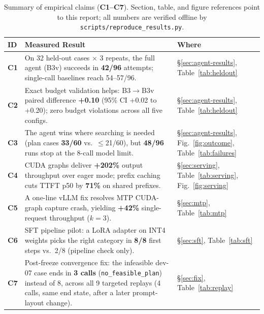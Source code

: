 \documentclass[10pt,letterpaper,twocolumn]{article}
\begin{document}
\begin{table}[t]
\centering\small
\caption{Summary of empirical claims (\textbf{C1--C7}). Section, table, and figure references point to this report; all numbers are verified offline by \texttt{scripts/reproduce\_results.py}.}\label{tab:claims}
\renewcommand{\arraystretch}{1.12}
\begin{tabularx}{\textwidth}{@{}l Y l@{}}
\toprule
\textbf{ID} & \textbf{Measured Result} & \textbf{Where} \\
\midrule
\textbf{C1} & On 32 held-out cases $\times$ 3 repeats, the full agent (B3v) succeeds in \textbf{42/96} attempts; single-call baselines reach 54--57/96. & \S\ref{sec:agent-results}, Table~\ref{tab:heldout} \\
\textbf{C2} & Exact budget validation helps: B3$\rightarrow$B3v paired difference \textbf{+0.10} (95\% CI +0.02 to +0.20); zero budget violations across all five configs. & \S\ref{sec:agent-results}, Table~\ref{tab:heldout} \\
\textbf{C3} & The agent wins where searching is needed (plan cases \textbf{33/60} vs.\ $\le$21/60), but \textbf{48/96} runs stop at the 8-call model limit. & \S\ref{sec:agent-results}, Fig.~\ref{fig:outcome}, Table~\ref{tab:failures} \\
\textbf{C4} & CUDA graphs deliver \textbf{+202\%} output throughput over eager mode; prefix caching cuts TTFT p50 by \textbf{71\%} on shared prefixes. & \S\ref{sec:serving}, Table~\ref{tab:serving}, Fig.~\ref{fig:serving} \\
\textbf{C5} & A one-line vLLM fix resolves MTP CUDA-graph capture crash, yielding \textbf{+42\%} single-request throughput ($k{=}3$). & \S\ref{sec:mtp}, Table~\ref{tab:mtp} \\
\textbf{C6} & SFT pipeline pilot: a LoRA adapter on INT4 weights picks the right category in \textbf{8/8} first steps vs.\ 2/8 (pipeline check only). & \S\ref{sec:sft}, Table~\ref{tab:sft} \\
\textbf{C7} & Post-freeze convergence fix: the infeasible dev-07 case ends in \textbf{3 calls} (\texttt{no\_feasible\_plan}) instead of 8, across all 9 targeted replays (4 calls, same end state, after a later prompt-layout change). & \S\ref{sec:fix}, Table~\ref{tab:replay} \\
\bottomrule
\end{tabularx}
\end{table}

\end{document}

